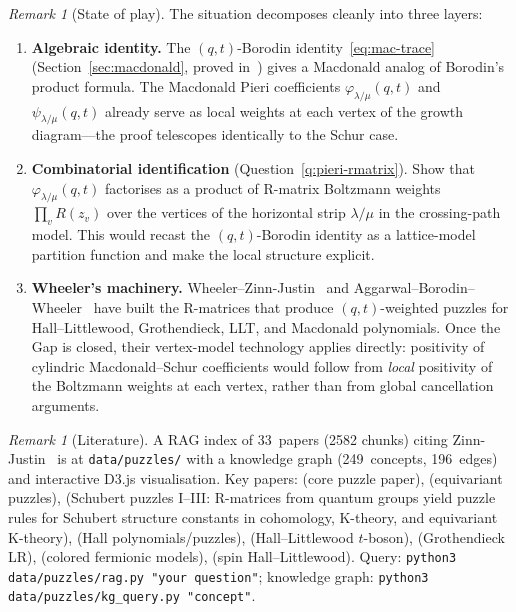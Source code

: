 \documentclass[11pt]{article}
\theoremstyle{plain}
\theoremstyle{definition}
\theoremstyle{remark}
\newtheorem{remark}[theorem]{Remark}
\begin{document}
\begin{remark}[State of play]\label{rem:state-of-play}
The situation decomposes cleanly into three layers:
\begin{enumerate}
\item[\textsc{Done.}]
  \textbf{Algebraic identity.}
  The $(q,t)$-Borodin identity~\eqref{eq:mac-trace}
  (Section~\ref{sec:macdonald}, proved
  in~\cite{langer-thesis}) gives a Macdonald analog of
  Borodin's product formula.  The Macdonald Pieri
  coefficients $\varphi_{\lambda/\mu}(q,t)$ and
  $\psi_{\lambda/\mu}(q,t)$ already serve as local weights
  at each vertex of the growth diagram---the proof
  telescopes identically to the Schur case.

\item[\textsc{Gap.}]
  \textbf{Combinatorial identification}
  (Question~\ref{q:pieri-rmatrix}).
  Show that $\varphi_{\lambda/\mu}(q,t)$ factorises as a
  product of R-matrix Boltzmann weights
  $\prod_v R(z_v)$ over the vertices of the horizontal
  strip $\lambda/\mu$ in the crossing-path model.
  This would recast the $(q,t)$-Borodin identity as a
  lattice-model partition function and make the local
  structure explicit.

\item[\textsc{Available.}]
  \textbf{Wheeler's machinery.}
  Wheeler--Zinn-Justin~\cite{wheeler-zinn-justin-2016,%
  wheeler-zinn-justin-2016b} and
  Aggarwal--Borodin--Wheeler~\cite{aggarwal-borodin-wheeler-2021}
  have built the R-matrices that produce $(q,t)$-weighted
  puzzles for Hall--Littlewood, Grothendieck, LLT, and
  Macdonald polynomials.  Once the Gap is closed, their
  vertex-model technology applies directly: positivity of
  cylindric Macdonald--Schur coefficients would follow from
  \emph{local} positivity of the Boltzmann weights at each
  vertex, rather than from global cancellation arguments.
\end{enumerate}
\end{remark}

\begin{remark}[Literature]
A RAG index of 33~papers (2582 chunks) citing
Zinn-Justin~\cite{zinn-justin-2009} is at
\texttt{data/puzzles/} with a knowledge graph (249~concepts,
196~edges) and interactive D3.js visualisation.  Key papers:
\cite{zinn-justin-2009} (core puzzle paper),
\cite{knutson-tao-2003} (equivariant puzzles),
\cite{knutson-zinn-justin-2017,knutson-zinn-justin-2021,knutson-zinn-justin-2023}
(Schubert puzzles I--III: R-matrices from quantum groups yield
puzzle rules for Schubert structure constants in cohomology,
K-theory, and equivariant K-theory),
\cite{wheeler-zinn-justin-2016} (Hall polynomials/puzzles),
\cite{wheeler-zinn-justin-2015} (Hall--Littlewood $t$-boson),
\cite{wheeler-zinn-justin-2016b} (Grothendieck LR),
\cite{aggarwal-borodin-wheeler-2021} (colored fermionic models),
\cite{gunna-wheeler-zinn-justin-2025} (spin Hall--Littlewood).
Query: \texttt{python3 data/puzzles/rag.py "your question"};
knowledge graph: \texttt{python3 data/puzzles/kg\_query.py "concept"}.
\end{remark}
\end{document}
